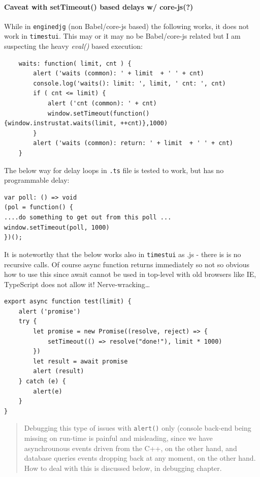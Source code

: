 \documentclass[11pt]{article}
\begin{document}
    \hypertarget{caveat-with-settimeout-based-delays-w-core-js}{%
\paragraph{Caveat with setTimeout() based delays w/
core-js(?)}\label{caveat-with-settimeout-based-delays-w-core-js}}

    While in \texttt{enginedjg} (non Babel/core-js based) the following
works, it does not work in \texttt{timestui}. This may or it may no be
Babel/core-js related but I am suspecting the heavy \emph{eval()} based
execution:

    \begin{verbatim}
    waits: function( limit, cnt ) {
        alert ('waits (common): ' + limit  + ' ' + cnt)
        console.log('waits(): limit: ', limit, ' cnt: ', cnt)
        if ( cnt <= limit) {
            alert ('cnt (common): ' + cnt)
            window.setTimeout(function(){window.instrustat.waits(limit, ++cnt)},1000)
        }
        alert ('waits (common): return: ' + limit  + ' ' + cnt)
    }
\end{verbatim}

    The below way for delay loops in \texttt{.ts} file is tested to work,
but has no programmable delay:

    \begin{verbatim}
var poll: () => void
(pol = function() {
....do something to get out from this poll ...
window.setTimeout(poll, 1000)
})();
\end{verbatim}

    It is noteworthy that the below works also in \texttt{timestui} as .js -
there is is no recursive calls. Of course async function returns
immediately so not so obvious how to use this since await cannot be used
in top-level with old browsers like IE, TypeScript does not allow it!
Nerve-wracking\ldots{}

    \begin{verbatim}
export async function test(limit) {
    alert ('promise')
    try {
        let promise = new Promise((resolve, reject) => {
            setTimeout(() => resolve("done!"), limit * 1000)
        })
        let result = await promise
        alert (result)
    } catch (e) {
        alert(e)
    }
}
\end{verbatim}

    \begin{quote}
Debugging this type of issues with \texttt{alert()} only (console
back-end being missing on run-time is painful and misleading, since we
have asynchrounous events driven from the C++, on the other hand, and
database queries events dropping back at any moment, on the other hand.
How to deal with this is discussed below, in debugging chapter.
\end{quote}
\end{document}
